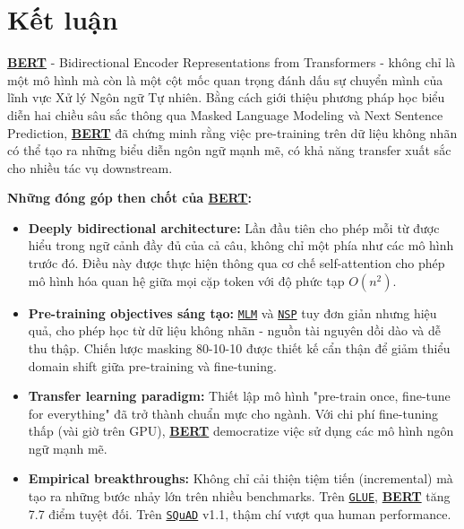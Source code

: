 \section{Kết luận}
\label{sec:ket_luan}

\hyperref[acro:bert]{\textbf{BERT}} - Bidirectional Encoder Representations from Transformers \cite{devlin2018bert} - không chỉ là một mô hình mà còn là một cột mốc quan trọng đánh dấu sự chuyển mình của lĩnh vực Xử lý Ngôn ngữ Tự nhiên. Bằng cách giới thiệu phương pháp học biểu diễn hai chiều sâu sắc thông qua Masked Language Modeling và Next Sentence Prediction, \hyperref[acro:bert]{\textbf{BERT}} đã chứng minh rằng việc pre-training trên dữ liệu không nhãn có thể tạo ra những biểu diễn ngôn ngữ mạnh mẽ, có khả năng transfer xuất sắc cho nhiều tác vụ downstream.

\textbf{Những đóng góp then chốt của \hyperref[acro:bert]{\textbf{BERT}}:}
\begin{itemize}
    \item \textbf{Deeply bidirectional architecture:} Lần đầu tiên cho phép mỗi từ được hiểu trong ngữ cảnh đầy đủ của cả câu, không chỉ một phía như các mô hình trước đó. Điều này được thực hiện thông qua cơ chế self-attention cho phép mô hình hóa quan hệ giữa mọi cặp token với độ phức tạp $O(n^2)$.
    
    \item \textbf{Pre-training objectives sáng tạo:} \hyperref[acro:mlm]{\texttt{MLM}} và \hyperref[acro:nsp]{\texttt{NSP}} tuy đơn giản nhưng hiệu quả, cho phép học từ dữ liệu không nhãn - nguồn tài nguyên dồi dào và dễ thu thập. Chiến lược masking 80-10-10 được thiết kế cẩn thận để giảm thiểu domain shift giữa pre-training và fine-tuning.
    
    \item \textbf{Transfer learning paradigm:} Thiết lập mô hình "pre-train once, fine-tune for everything" đã trở thành chuẩn mực cho ngành. Với chi phí fine-tuning thấp (vài giờ trên GPU), \hyperref[acro:bert]{\textbf{BERT}} democratize việc sử dụng các mô hình ngôn ngữ mạnh mẽ.
    
    \item \textbf{Empirical breakthroughs:} Không chỉ cải thiện tiệm tiến (incremental) mà tạo ra những bước nhảy lớn trên nhiều benchmarks. Trên \hyperref[acro:glue]{\texttt{GLUE}}, \hyperref[acro:bert]{\textbf{BERT}} tăng 7.7 điểm tuyệt đối. Trên \hyperref[acro:squad]{\texttt{SQuAD}} v1.1, thậm chí vượt qua human performance.
\end{itemize}

